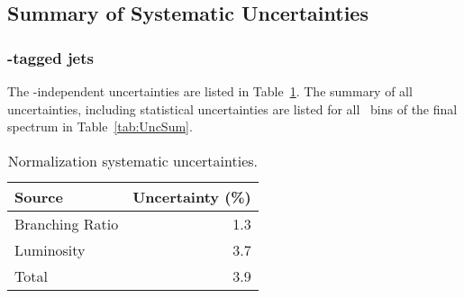 \subsection{Summary of Systematic Uncertainties}
%

\subsubsection{\Dstar-tagged jets}

The \pt-independent uncertainties are listed in Table~\ref{tab:CorrFixSystUnc}. 
The summary of all uncertainties, including statistical uncertainties are listed for all \ptchjet\ bins of the final spectrum in Table~\ref{tab:UncSum}.

\begin{table}[bth]
\caption{Normalization systematic uncertainties.}
     \label{tab:CorrFixSystUnc}
\begin{center}
    \begin{tabular}{lr}
    \hline
Source & Uncertainty (\%) \\ \hline
Branching Ratio & 1.3 \\
Luminosity &  3.7\\
\hline
Total & 3.9 \\
\hline
    \end{tabular}
    \end{center}
    \end{table}
    
